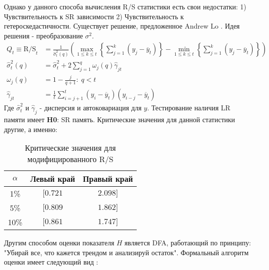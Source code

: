 Однако у данного способа вычисления R/S статистики есть свои недостатки: 1) Чувствительность к SR зависимости 2) Чувствительность к гетероскедастичности. Существует решение, предложенное Andrew Lo \cite{andrew1991longterm}. Идея решения - преобразование $\sigma^2$.
\begin{equation}
	\begin{split}
		Q_t \equiv \text{R/S}_t & = \frac{1}{\hat{\sigma}^2_t(q)} \left(\max_{1 \le k \le t} \left\{\sum_{j = 1}^k (y_j - \overline{y}_t)\right\} - \min_{1 \le k \le t} \left\{\sum_{j = 1}^k (y_j - \overline{y}_t)\right\}\right)\\
		\hat{\sigma}^2_t(q) & = \hat{\sigma}^2_t + 2 \sum_{j = 1}^q \omega_j(q) \hat{\gamma}_{jt}\\
		\omega_j(q) & = 1 - \frac{j}{q + 1}: \; q < t\\
		\hat{\gamma}_{jt} & = \frac{1}{t} \sum_{i = j + 1}^t (y_i - \overline{y}_t)(y_{i - j} - \overline{y}_t)
	\end{split}
\end{equation}
Где $\hat{\sigma}^2_t$ и $\hat{\gamma}_j$ - дисперсия и автоковариация для $y$. Тестирование наличия LR памяти имеет \textbf{H0}: SR память. Критические значения для данной статистики другие, а именно:
\begin{table}[H]
	\centering
	\begin{tabular}{c|cc}
		\toprule
		$\alpha$ & Левый край & Правый край\\
		\midrule[0.02cm]
		1\% & $[0.721$ & $2.098]$\\
		5\% & $[0.809$ & $1.862]$\\
		10\% & $[0.861$ & $1.747]$\\
		\midrule[0.02cm]
	\end{tabular}
	\caption{Критические значения для модифицированного R/S}
\end{table}
\noindent Другим способом оценки показателя $H$ является DFA, работающий по принципу: "Убирай все, что кажется трендом и анализируй остаток". Формальный алгоритм оценки имеет следующий вид \cite{garafutdinov2021research}:
